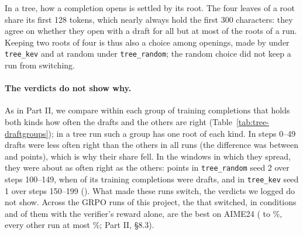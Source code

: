In a tree, how a completion opens is settled by its root. The four leaves of a root share its first 128 tokens, which
nearly always hold the first 300 characters: they agree on whether they open with a draft for all but at most
 of the roots of a run. Keeping two roots of four is thus also a choice among openings, made by
\kev{} under \texttt{tree\_kev} and at random under \texttt{tree\_random}; the random choice did not keep a run from
switching.

\begin{table}[t]
\centering\small

\caption{The share of MATH-500 completions that open with an informal draft (no math delimiter, markdown heading or
bold in the first 300 characters), at each periodic evaluation (greedy, every 50 steps) and in the final evaluation,
per run, with the final accuracies.}
\label{tab:tree-drafts}
\end{table}

\paragraph{The verdicts do not show why.} As in Part II, we compare within each group of training completions that
holds both kinds how often the drafts and the others are right (Table~\ref{tab:tree-draftgroups}); in a tree run such a
group has one root of each kind. In steps 0--49 drafts were less often right than the others in
all  runs (the difference was between  and  points), which is
why their share fell. In the windows in which they spread, they were about as often right as the others:
 points in \texttt{tree\_random} seed 2 over steps 100--149, when
 of its training completions were drafts, and  in
\texttt{tree\_kev} seed 1 over steps 150--199 (). What made these runs switch, the verdicts
we logged do not show. Across the  GRPO runs of this project, the  that switched, in
 conditions and  of them with the verifier's reward alone, are the
 best on AIME24 ( to \%, every other run at most
\%; Part II, \S8.3).

\begin{table}[t]
\centering\small

\caption{Training completions that open with an informal draft, per 50-step window: their share, and $\Delta$ right,
the mean over the groups that hold both kinds of the share of drafts the verifier accepts minus that of the other
completions of the group, in percentage points.}
\label{tab:tree-draftgroups}
\end{table}

